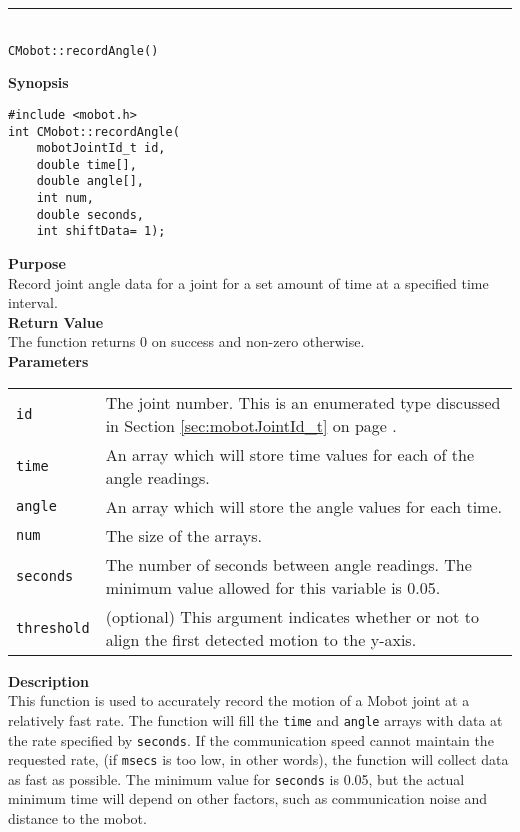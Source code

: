 \noindent
\vspace{5pt}
\rule{4.5in}{0.015in}\\
\noindent
{\LARGE \texttt{CMobot::recordAngle()}}\\
{}

\noindent
{\bf Synopsis}
\vspace{-8pt}
\begin{verbatim}
#include <mobot.h>
int CMobot::recordAngle(
    mobotJointId_t id, 
    double time[], 
    double angle[], 
    int num, 
    double seconds, 
    int shiftData= 1);
\end{verbatim}

\noindent
{\bf Purpose}\\
Record joint angle data for a joint for a set amount of time at a specified time interval.\\

\noindent
{\bf Return Value}\\
The function returns 0 on success and non-zero otherwise.\\

\noindent
{\bf Parameters}\\
\vspace{-0.1in}
\begin{description}
\item               
\begin{tabular}{p{15 mm}p{145 mm}}
\texttt{id} & The joint number. This is an enumerated type 
discussed in Section \ref{sec:mobotJointId_t} on page
\pageref{sec:mobotJointId_t}.\\
\texttt{time} & An array which will store time values for each of the angle readings. \\
\texttt{angle} & An array which will store the angle values for each time. \\
\texttt{num} & The size of the arrays. \\
\texttt{seconds} & The number of seconds between angle readings. The minimum value allowed for
this variable is 0.05. \\
\texttt{threshold} & (optional) This argument indicates whether or not to align the first
detected motion to the y-axis. 
\end{tabular}
\end{description}

\noindent
{\bf Description}\\
This function is used to accurately record the motion of a Mobot joint at a relatively fast
rate. The function will fill the \texttt{time} and \texttt{angle} arrays with data
at the rate specified by \texttt{seconds}. If the communication speed cannot maintain 
the requested rate, (if \texttt{msecs} is too low, in other words), the function will
collect data as fast as possible. The minimum value for \texttt{seconds} is 0.05, but
the actual minimum time will depend on other factors, such as communication noise and
distance to the mobot.


